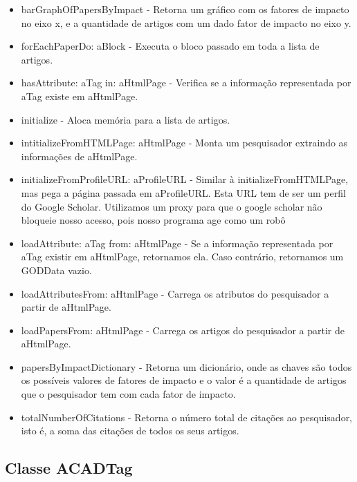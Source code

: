 \begin{itemize}
  \item barGraphOfPapersByImpact - Retorna um gráfico com os fatores de impacto no eixo x, e a quantidade de artigos com um  dado fator de impacto no eixo y.

  \item forEachPaperDo: aBlock - Executa o bloco passado em toda a lista de artigos.

  \item hasAttribute: aTag in: aHtmlPage - Verifica se a informação representada por aTag existe em aHtmlPage.

  \item initialize - Aloca memória para a lista de artigos.

  \item intitializeFromHTMLPage: aHtmlPage - Monta um pesquisador extraindo as informações de aHtmlPage.

  \item initializeFromProfileURL: aProfileURL - Similar à initializeFromHTMLPage, mas pega a página passada em aProfileURL. Esta URL tem de ser um perfil do Google Scholar. Utilizamos um proxy para que o google scholar não bloqueie nosso acesso, pois nosso programa age como um robô

  \item loadAttribute: aTag from: aHtmlPage - Se a informação representada por aTag existir em aHtmlPage, retornamos ela. Caso contrário, retornamos um GODData vazio.

  \item loadAttributesFrom: aHtmlPage - Carrega os atributos do pesquisador a partir de aHtmlPage.

  \item loadPapersFrom: aHtmlPage - Carrega os artigos do pesquisador a partir de aHtmlPage.

  \item papersByImpactDictionary - Retorna um dicionário, onde as chaves são todos os possíveis valores de  fatores de impacto e o valor é a quantidade de artigos que o pesquisador tem com cada fator de impacto.

  \item totalNumberOfCitations - Retorna o número total de citações ao pesquisador, isto é, a soma das citações de todos os  seus artigos.

\end{itemize}

\subsection{Classe ACADTag}

